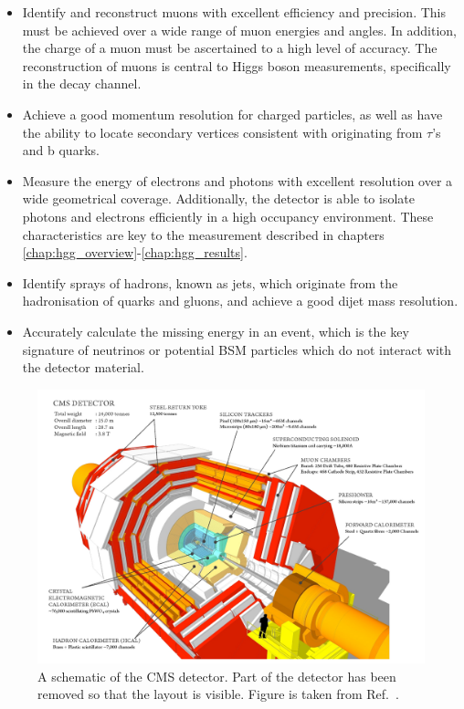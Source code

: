 \begin{itemize}
    \item Identify and reconstruct muons with excellent efficiency and precision. This must be achieved over a wide range of muon energies and angles. In addition, the charge of a muon must be ascertained to a high level of accuracy. The reconstruction of muons is central to Higgs boson measurements, specifically in the \Hfl decay channel.
    \item Achieve a good momentum resolution for charged particles, as well as have the ability to locate secondary vertices consistent with originating from $\tau$'s and b quarks.
    \item Measure the energy of electrons and photons with excellent resolution over a wide geometrical coverage. Additionally, the detector is able to isolate photons and electrons efficiently in a high occupancy environment. These characteristics are key to the \Hgg measurement described in chapters \ref{chap:hgg_overview}-\ref{chap:hgg_results}.
    \item Identify sprays of hadrons, known as jets, which originate from the hadronisation of quarks and gluons, and achieve a good dijet mass resolution.
    \item Accurately calculate the missing energy in an event, which is the key signature of neutrinos or potential BSM particles which do not interact with the detector material.
\end{itemize}

\begin{figure}[htb!]
  \centering
  \includegraphics[width=1\textwidth]{Figures/cms/cms_detector.pdf}
  \caption[The CMS detector]
  {
    A schematic of the CMS detector. Part of the detector has been removed so that the layout is visible. Figure is taken from Ref.~\cite{Sakuma_2014}.
  }
  \label{fig:cms_detector}
\end{figure}

